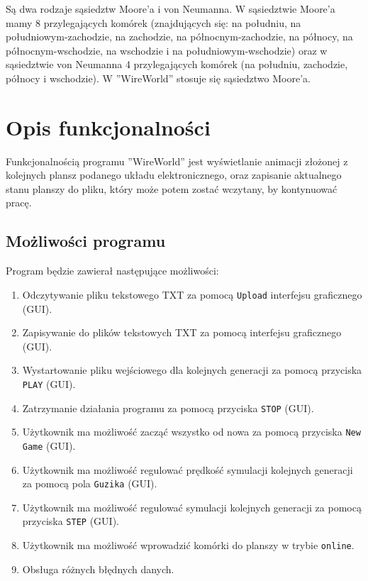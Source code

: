 \documentclass[a4paper, 12pt]{article}
\begin{document}
			\hspace*{1cm} Są dwa rodzaje sąsiedztw Moore'a i von Neumanna. W sąsiedztwie Moore'a mamy 8 przylegających komórek (znajdujących się: na południu, na południowym-zachodzie, na zachodzie, na północnym-zachodzie, na północy, na północnym-wschodzie, na wschodzie i na południowym-wschodzie) oraz w sąsiedztwie von Neumanna 4 przylegających komórek (na południu, zachodzie, północy i wschodzie). \newline
			\hspace*{1cm} W ''WireWorld'' stosuje się sąsiedztwo Moore'a.
\newpage
	\section{Opis funkcjonalności}
			\hspace*{1cm} Funkcjonalnością programu ''WireWorld'' jest wyświetlanie animacji złożonej z kolejnych plansz podanego układu elektronicznego, oraz zapisanie aktualnego
stanu planszy do pliku, który może potem zostać wczytany, by kontynuować
pracę.
		\subsection{Możliwości programu}
			\hspace*{1cm} Program będzie zawierał następujące możliwości:
		
 		\begin{enumerate}
 			\item Odczytywanie pliku tekstowego TXT za pomocą \texttt{Upload} interfejsu graficznego (GUI).
 			\item Zapisywanie do plików tekstowych TXT za pomocą interfejsu graficznego (GUI).
 			\item Wystartowanie pliku wejściowego dla kolejnych generacji za pomocą przyciska \texttt{PLAY} (GUI).
 			\item Zatrzymanie działania programu za pomocą przyciska \texttt{STOP} (GUI).
 			\item Użytkownik ma możliwość zacząć wszystko od nowa za pomocą przyciska \texttt{New Game} (GUI).
 			\item Użytkownik ma możliwość regulować prędkość symulacji kolejnych generacji za pomocą pola \texttt{Guzika} (GUI).
 			\item Użytkownik ma możliwość regulować symulacji kolejnych generacji za pomocą przyciska \texttt{STEP} (GUI).
 			\item Użytkownik ma możliwość wprowadzić komórki do planszy w trybie \texttt{online}.
 			\item Obsługa różnych błędnych danych.
 		\end{enumerate}
 		
\end{document}
